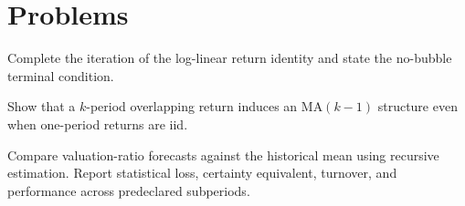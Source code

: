 \section{Problems}

\begin{exercise}
Complete the iteration of the log-linear return identity and state the no-bubble
terminal condition.
\end{exercise}
\begin{exercise}
Show that a $k$-period overlapping return induces an MA$(k-1)$ structure even when
one-period returns are iid.
\end{exercise}
\begin{exercise}[Research]
Compare valuation-ratio forecasts against the historical mean using recursive
estimation. Report statistical loss, certainty equivalent, turnover, and performance
across predeclared subperiods.
\end{exercise}
